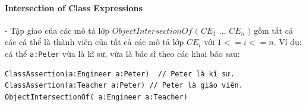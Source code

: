 \paragraph{Intersection of Class Expressions} - Tập giao của các mô tả lớp $ObjectIntersectionOf$ $($ $CE_{1}$ ... $CE_{n}$ $)$ gồm tất cả các cá thể là thành viên của tất cả các mô tả lớp $CE_{i}$ với $1<=i<=n$. Ví dụ: cá thể \verb|a:Peter| vừa là kĩ sư, vừa là bác sĩ theo các khai báo sau:
\begin{verbatim}
ClassAssertion(a:Engineer a:Peter)  // Peter là kĩ sư.
ClassAssertion(a:Teacher a:Peter) // Peter là giáo viên.
ObjectIntersectionOf( a:Engineer a:Teacher)
\end{verbatim}























